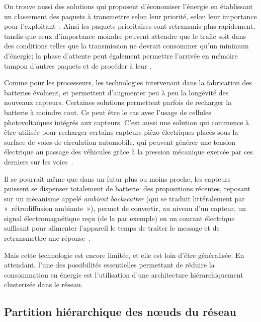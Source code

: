 On trouve aussi des solutions qui proposent d'économiser l'énergie en établissant un classement des paquets à transmettre selon leur priorité, \cad selon leur importance pour l'exploitant~\cite{SAS14}.
Ainsi les paquets prioritaires sont retransmis plus rapidement, tandis que ceux d'importance moindre peuvent attendre que le trafic soit dans des conditions telles que la transmission ne devrait consommer qu'un minimum d'énergie; la phase d'attente peut également permettre l'arrivée en mémoire tampon d'autres paquets et de procéder à leur .

Comme pour les processeurs, les technologies intervenant dans la fabrication des batteries évoluent, et permettent d'augmenter peu à peu la longévité des nouveaux capteurs.
Certaines solutions permettent parfois de recharger la batterie à moindre cout.
Ce peut être le cas avec l'usage de cellules photovoltaïques intégrés aux capteurs.
C'est aussi une solution qui commence à être utilisée pour recharger certains capteurs piézo-électriques placés sous la surface de voies de circulation automobile, qui peuvent générer une tension électrique au passage des véhicules grâce à la pression mécanique exercée par ces derniers sur les voies~\cite{sti}.

Il se pourrait même que dans un futur plus ou moins proche, les capteurs puissent se dispenser totalement de batterie: des propositions récentes, reposant sur un mécanisme appelé \textit{ambient backscatter} (qui se traduit littéralement par « rétrodiffusion ambiante »), permet de convertir, au niveau d'un capteur, un signal électromagnétique reçu (de la \sdb par exemple) en un courant électrique suffisant pour alimenter l'appareil le temps de traiter le message et de retransmettre une réponse~\cite{LPTGWS13}.

Mais cette technologie est encore limitée, et elle est loin d'être généralisée.
En attendant, l'une des possibilités essentielles permettant de réduire la consommation en énergie est l'utilisation d'une architecture  hiérarchiquement clusterisée dans le réseau.

    \subsection{Partition hiérarchique des nœuds du réseau}%
    \label{st:subsec:partition}

